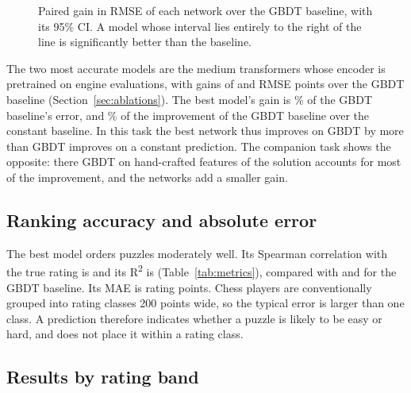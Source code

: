 \documentclass[11pt]{article}
\begin{document}
\begin{figure}[htbp]\centering
{}
\caption{Paired gain in RMSE of each network over the GBDT baseline, with
its 95\% CI. A model whose interval lies entirely to the right of the line is
significantly better than the baseline.}
\label{fig:gains}
\end{figure}

\ifchangestart
The two most accurate models are the medium transformers whose encoder is
pretrained on engine evaluations, with gains of
 and
 RMSE points over the GBDT
baseline (Section~\ref{sec:ablations}).
\fi
The best model's gain is \% of the GBDT baseline's
error, and \% of the improvement of the GBDT baseline
over the constant baseline. In this task the best network thus improves on
GBDT by more than GBDT improves on a constant prediction.
\ifshown
The companion task shows the opposite: there GBDT on hand-crafted features of
the solution accounts for most of the improvement, and the networks add a
smaller gain.
\fi

\subsection{Ranking accuracy and absolute error}

The best model orders puzzles moderately well. Its Spearman correlation with
the true rating is  and its R\textsuperscript{2} is 
(Table~\ref{tab:metrics}), compared with  and
 for the GBDT baseline. Its MAE is  rating
points. Chess players are conventionally grouped into rating classes 200
points wide, so the typical error is larger than one class. A prediction
therefore indicates whether a puzzle is likely to be easy or hard, and does
not place it within a rating class.

\begin{table}[htbp]\centering\small
{}
\caption{All metrics for every model on the test set. RMSE and MAE are in
rating points (lower is better); for R\textsuperscript{2} and Spearman's rank correlation
higher is better. The constant baseline has no rank correlation.}
\label{tab:metrics}
\end{table}

\subsection{Results by rating band}
\end{document}
